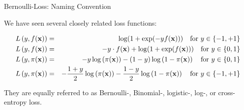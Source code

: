 \documentclass[11pt,compress,t,notes=noshow, xcolor=table]{beamer}
\begin{document}
\begin{vbframe}{Bernoulli-Loss: Naming Convention}

We have seen several closely related loss functions: %


\begin{eqnarray*} L\left(y, f(\mathbf{x})\right) &=& \log(1+\exp(-yf(\mathbf{x}))) \quad \text{for } y \in \{-1, +1\} \\
L\left(y, f(\mathbf{x})\right) &=& - y \cdot f(\mathbf{x}) + \log(1 + \exp(f(\mathbf{x}))) \quad \text{for } y \in \{0, 1\} \\
L\left(y, \pi(\mathbf{x})\right) &=& - y \log \left(\pi(\mathbf{x})\right) - (1 - y) \log \left(1 - \pi(\mathbf{x})\right) \quad \text{for } y \in \{0, 1\} \\
L\left(y, \pi(\mathbf{x})\right) &=& - \frac{1 + y}{2} \log\left(\pi(\mathbf{x})\right) - \frac{1 - y}{2} \log\left(1 - \pi(\mathbf{x})\right) \quad \text{for } y \in \{-1, +1\} \end{eqnarray*}

\lz

They are equally referred to as Bernoulli-, Binomial-, logistic-, log-, or cross-entropy loss. %





\end{vbframe}
\end{document}
